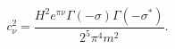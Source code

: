\begin{equation}
c_\nu^{2}=\frac{H^2e^{\pi\nu}\Gamma(-\sigma)\Gamma(-\sigma^{*})}{2^5\pi^4
m^{2}}. \label{eq:nor}
\end{equation}

